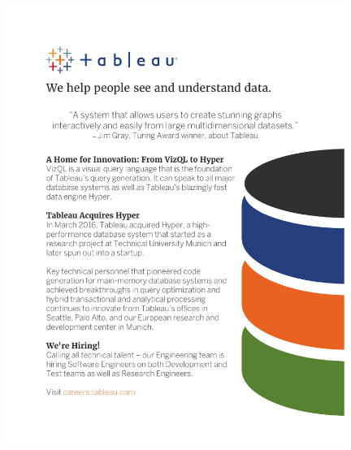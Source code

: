 \begin{minipage}{\textwidth}

\thispagestyle{empty}
\vspace{-8mm}
\hspace*{-16mm}\includegraphics[width=110mm]{ads/tableau.pdf}
\end{minipage}



